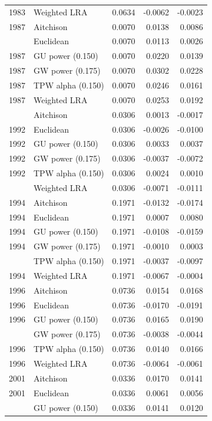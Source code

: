 \begin{longtable}[t]{rlrrr}
1983 & Weighted LRA & 0.0634 & -0.0062 & -0.0023\\
1987 & Aitchison & 0.0070 & 0.0138 & 0.0086\\
\addlinespace
1987 & Euclidean & 0.0070 & 0.0113 & 0.0026\\
1987 & GU power (0.150) & 0.0070 & 0.0220 & 0.0139\\
1987 & GW power (0.175) & 0.0070 & 0.0302 & 0.0228\\
1987 & TPW alpha (0.150) & 0.0070 & 0.0246 & 0.0161\\
1987 & Weighted LRA & 0.0070 & 0.0253 & 0.0192\\
\addlinespace
1992 & Aitchison & 0.0306 & 0.0013 & -0.0017\\
1992 & Euclidean & 0.0306 & -0.0026 & -0.0100\\
1992 & GU power (0.150) & 0.0306 & 0.0033 & 0.0037\\
1992 & GW power (0.175) & 0.0306 & -0.0037 & -0.0072\\
1992 & TPW alpha (0.150) & 0.0306 & 0.0024 & 0.0010\\
\addlinespace
1992 & Weighted LRA & 0.0306 & -0.0071 & -0.0111\\
1994 & Aitchison & 0.1971 & -0.0132 & -0.0174\\
1994 & Euclidean & 0.1971 & 0.0007 & 0.0080\\
1994 & GU power (0.150) & 0.1971 & -0.0108 & -0.0159\\
1994 & GW power (0.175) & 0.1971 & -0.0010 & 0.0003\\
\addlinespace
1994 & TPW alpha (0.150) & 0.1971 & -0.0037 & -0.0097\\
1994 & Weighted LRA & 0.1971 & -0.0067 & -0.0004\\
1996 & Aitchison & 0.0736 & 0.0154 & 0.0168\\
1996 & Euclidean & 0.0736 & -0.0170 & -0.0191\\
1996 & GU power (0.150) & 0.0736 & 0.0165 & 0.0190\\
\addlinespace
1996 & GW power (0.175) & 0.0736 & -0.0038 & -0.0044\\
1996 & TPW alpha (0.150) & 0.0736 & 0.0140 & 0.0166\\
1996 & Weighted LRA & 0.0736 & -0.0064 & -0.0061\\
2001 & Aitchison & 0.0336 & 0.0170 & 0.0141\\
2001 & Euclidean & 0.0336 & 0.0061 & 0.0056\\
\addlinespace
2001 & GU power (0.150) & 0.0336 & 0.0141 & 0.0120\\

\end{longtable}

